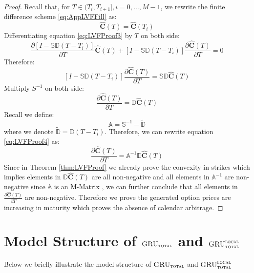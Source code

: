 \documentclass[letterpaper,12pt,titlepage,oneside,final]{book}
\numberwithin{equation}{section}
\theoremstyle{definition}
\newcommand{\modelT}{\textsc{GRU}_{\textsc{total}}}
\newcommand{\modelL}{\textsc{GRU}_{\textsc{total}}^{\textsc{local}}}
\begin{document}
\begin{proof}
	Recall that, for $T \in (T_i,T_{i+1}], i=0,\dots, M-1$, we rewrite the finite difference scheme \eqref{eq:AppLVFFill}  as:
	\begin{equation}
		[I-\mathcal{\mathbb{S}}\mathcal{\mathbb{D}}(T-T_i) ]\widehat{\mathbf{C}}(T)=	\widehat{\mathbf{C}}(T_i)
		\label{eq:LVFProof3}
	\end{equation}
Differentiating equation \eqref{eq:LVFProof3} by $T$ on both side:
\[
	\frac{\partial  [I-\mathcal{\mathbb{S}}\mathcal{\mathbb{D}}(T-T_i) ]}{ \partial T} \widehat{\mathbf{C}}(T) +[I-\mathcal{\mathbb{S}}\mathcal{\mathbb{D}}(T-T_i) ]\frac{\partial \widehat{\mathbf{C}}(T)}{ \partial T} =  0
\]
Therefore:
\[
	[I-\mathcal{\mathbb{S}}\mathcal{\mathbb{D}}(T-T_i) ]\frac{\partial \widehat{\mathbf{C}}(T)}{ \partial T} =  	 \mathcal{\mathbb{S}}\mathcal{\mathbb{D}} \widehat{\mathbf{C}}(T)
\]
Multiply $S^{-1}$ on both side:
\begin{equation}
	[S^{-1}-\mathcal{\mathbb{D}}(T-T_i)]\frac{\partial \widehat{\mathbf{C}}(T)}{ \partial T} =  	 \mathcal{\mathbb{D}} \widehat{\mathbf{C}}(T)
	\label{eq:LVFProof4}
\end{equation}
Recall we define:
\[\mathcal{\mathbb{A}}=\mathcal{\mathbb{S}}^{-1}-\widetilde{\mathcal{\mathbb{D}}}\]
where we denote $\widetilde{\mathcal{\mathbb{D}}}=\mathcal{\mathbb{D}}(T-T_i)$.
Therefore, we can rewrite equation \eqref{eq:LVFProof4} as:
		\begin{equation}
			\frac{\partial \widehat{\mathbf{C}}(T)}{ \partial T} =\mathcal{\mathbb{A}}^{-1}   \mathcal{\mathbb{D}} \widehat{\mathbf{C}}(T)
			\label{eq:LVFProof5}
		\end{equation}
		Since in Theorem \ref{thm:LVFProof} we already prove the convexity in strikes which implies elements in $\mathcal{\mathbb{D}} \widehat{\mathbf{C}}(T)$ are all non-negative and all elements in $\mathcal{\mathbb{A}}^{-1}$ are non-negative since $\mathcal{\mathbb{A}}$ is an M-Matrix \cite{plemmons1977m}, we can further conclude that all elements in  $\frac{\partial \widehat{\mathbf{C}}(T)}{ \partial T}$ are non-negative. Therefore we prove the generated option prices are increasing in maturity which proves the absence of calendar arbitrage.
\end{proof}



\chapter{Model Structure of $\modelT$ and  $\modelL$}
\label{App:modelstructure}
Below we briefly illustrate the model structure of $\modelT$ and $\modelL$
\end{document}

